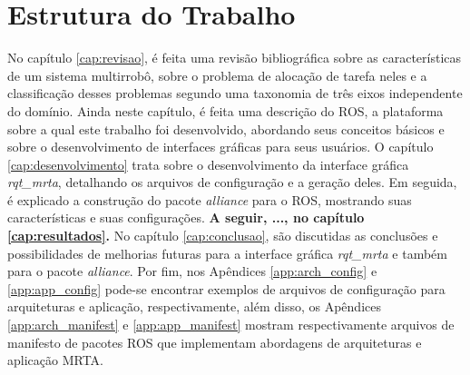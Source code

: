     \section{Estrutura do Trabalho} \label{sec:estrutura}
        No capítulo \ref{cap:revisao}, é feita uma revisão bibliográfica sobre as características de um sistema multirrobô, sobre o problema de alocação de tarefa neles e a classificação desses problemas segundo uma taxonomia de três eixos independente do domínio. Ainda neste capítulo, é feita uma descrição do ROS, a plataforma sobre a qual este trabalho foi desenvolvido, abordando seus conceitos básicos e sobre o desenvolvimento de interfaces gráficas para seus usuários. O capítulo \ref{cap:desenvolvimento} trata sobre o desenvolvimento da interface gráfica \textit{rqt\_mrta}, detalhando os arquivos de configuração e a geração deles. Em seguida, é explicado a construção do pacote \textit{alliance} para o ROS, mostrando suas características e suas configurações. \textbf{\color{red}A seguir, ..., no capítulo \ref{cap:resultados}.} No capítulo \ref{cap:conclusao}, são discutidas as conclusões e possibilidades de melhorias futuras para a interface gráfica \textit{rqt\_mrta} e também para o pacote \textit{alliance}. Por fim, nos Apêndices \ref{app:arch_config} e \ref{app:app_config} pode-se encontrar exemplos de arquivos de configuração para arquiteturas e aplicação, respectivamente, além disso, os Apêndices \ref{app:arch_manifest} e \ref{app:app_manifest} mostram respectivamente arquivos de manifesto de pacotes ROS que implementam abordagens de arquiteturas e aplicação MRTA.